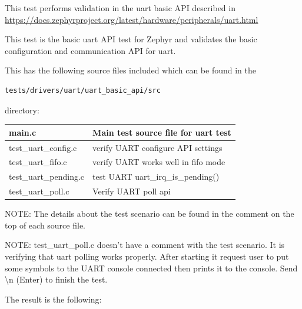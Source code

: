 \documentclass[11pt,a4paper,oneside]{article}
\begin{document}
This test performs validation in the uart basic API described in
\url{https://docs.zephyrproject.org/latest/hardware/peripherals/uart.html}

This test is the basic uart API test for Zephyr and validates the basic
configuration and communication API for uart.

This has the following source files included which can be found in the
\begin{lstlisting}
tests/drivers/uart/uart_basic_api/src
\end{lstlisting}
directory:

\begin{tabular}{|l|l|}
  \hline
  main.c & Main test source file for uart test \\
  \hline
  test\_uart\_config.c & verify UART configure API settings \\
  \hline
  test\_uart\_fifo.c & verify UART works well in fifo mode \\
  \hline
  test\_uart\_pending.c & test UART uart\_irq\_is\_pending() \\
  \hline
  test\_uart\_poll.c & Verify UART poll api \\
  \hline
\end{tabular}

NOTE: The details about the test scenario can be found in the comment on
the top of each source file.

NOTE: test\_uart\_poll.c doesn't have a comment with the test scenario.
It is verifying that uart polling works properly. After starting it
request user to put some symbols to the UART console connected then
prints it to the console. Send \textbackslash n (Enter) to finish the
test.

The result is the following:
\end{document}
